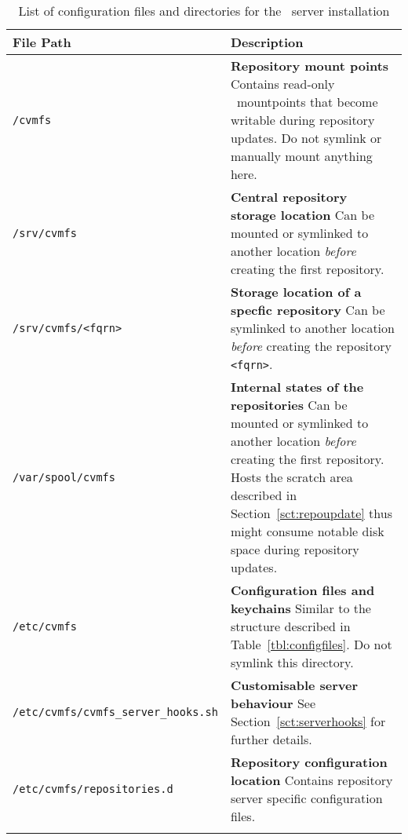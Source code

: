 \begin{longtable}{lX}
	\toprule
	{\bf\centering File Path} & {\bf\centering Description} \\
	\midrule

	\texttt{/cvmfs} & \textbf{Repository mount points} \newline
	Contains read-only \aufs\ mountpoints that become writable during repository updates. Do not symlink or manually mount anything here. \\
	\addlinespace

	\texttt{/srv/cvmfs} & \textbf{Central repository storage location} \newline
	Can be mounted or symlinked to another location \emph{before} creating the first repository. \\
	\addlinespace

	\texttt{/srv/cvmfs/<fqrn>} & \textbf{Storage location of a specfic repository} \newline
	Can be symlinked to another location \emph{before} creating the repository \texttt{<fqrn>}. \\
	\addlinespace

	\texttt{/var/spool/cvmfs} & \textbf{Internal states of the repositories} \newline
	Can be mounted or symlinked to another location \emph{before} creating the first repository. 
	Hosts the scratch area described in Section~\ref{sct:repoupdate} thus might consume notable disk space during repository updates. \\
	\addlinespace

	\texttt{/etc/cvmfs} & \textbf{Configuration files and keychains} \newline
	Similar to the structure described in Table~\ref{tbl:configfiles}. Do not symlink this directory. \\
	\addlinespace

	\texttt{/etc/cvmfs/cvmfs\_server\_hooks.sh} & \textbf{Customisable server behaviour} \newline
	See Section~\ref{sct:serverhooks} for further details. \\
	\addlinespace

	\texttt{/etc/cvmfs/repositories.d} & \textbf{Repository configuration location} \newline
	Contains repository server specific configuration files.
	 \\
	\bottomrule
	\caption{List of configuration files and directories for the \cvmfs\ server installation}
	\label{tbl:serveranatomyelements}
\end{longtable}

